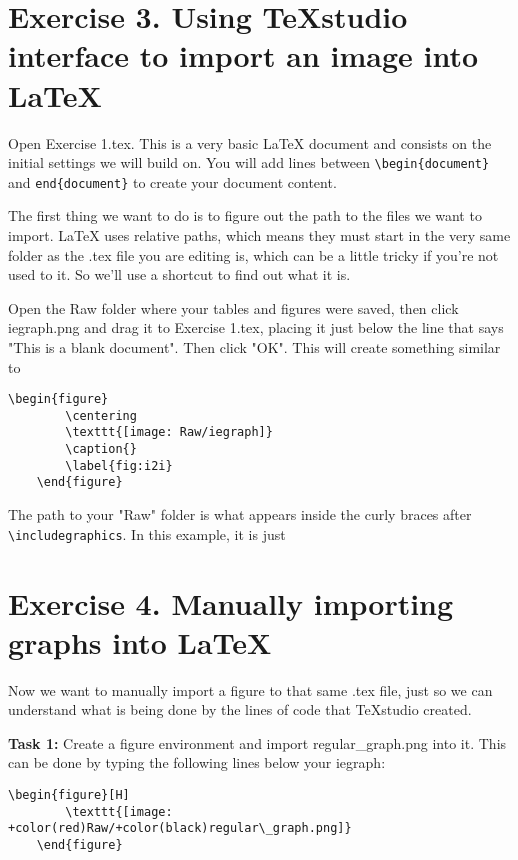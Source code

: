 \documentclass[12pts]{report}
\begin{document}
\section*{Exercise 3. Using TeXstudio interface to import an image into \LaTeX}
Open Exercise 1.tex. This is a very basic {\LaTeX} document and consists on the initial settings we will build on. You will add lines between \verb|\begin{document}| and \verb|end{document}| to create your document content.


The first thing we want to do is to figure out the path to the files we want to import. {\LaTeX} uses relative paths, which means they must start in the very same folder as the .tex file you are editing is, which can be a little tricky if you're not used to it. So we'll use a shortcut to find out what it is.

Open the Raw folder where your tables and figures were saved, then click iegraph.png and drag it to Exercise 1.tex, placing it just below the line that says "This is a blank document". Then click "OK". This will create something similar to

\begin{center}
\begin{Verbatim}[commandchars=+\(\)]
	\begin{figure}
		\centering
		\texttt{[image: Raw/iegraph]}
		\caption{}
		\label{fig:i2i}
	\end{figure}
\end{Verbatim}
\end{center}

The path to your "Raw" folder is what appears inside the curly braces after \verb|\includegraphics|. In this example, it is just \color{red}{\verb|Raw/|}\color{black}{.}

\section*{Exercise 4. Manually importing graphs into \LaTeX}

Now we want to manually import a figure to that same .tex file, just so we can understand what is being done by the lines of code that TeXstudio created.

\textbf{Task 1:} Create a figure environment and import regular\_graph.png into it. This can be done by typing the following lines below your iegraph:

\begin{center}
	\begin{Verbatim}[commandchars=+\(\)]
	\begin{figure}[H]
		\texttt{[image: +color(red)Raw/+color(black)regular\_graph.png]}
	\end{figure}
	\end{Verbatim}
\end{center}
\end{document}

